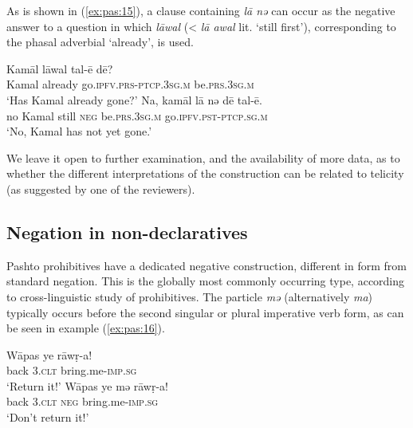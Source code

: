 \documentclass[output=paper,colorlinks,citecolor=brown]{langscibook}
\begin{document}
As is shown in (\ref{ex:pas:15}), a clause containing \textit{l\={a}  nə} can occur as the negative answer to a question in which \textit{l\={a}wal} (< \textit{l\={a} awal} lit. ‘still first’), corresponding to the phasal adverbial ‘already’, is used.

\ea\label{ex:pas:15}
    \ea\label{ex:pas:15a}
        \gll Kam\={a}l l\={a}wal tal-\={e} d\={e}? \\
             Kamal already go.\textsc{ipfv.prs-ptcp.3sg.m} be.\textsc{prs.3sg.m} \\
        \glt ‘Has Kamal already gone?’
    \ex\label{ex:pas:15b}
        \gll Na, kam\={a}l l\={a} nə d\={e} tal-\={e}.\\
             no Kamal still \textsc{neg} be.\textsc{prs.3sg.m}  go.\textsc{ipfv.pst-ptcp.sg.m}\\
        \glt ‘No, Kamal has not yet gone.’
    \z
\z 

We leave it open to further examination, and the availability of more data, as to whether the different interpretations of the construction can be related to telicity (as suggested by one of the reviewers).

\subsection{Negation in non-declaratives}\label{sec:pas:2.2}

Pashto prohibitives have a dedicated negative construction, different in form from standard negation. This is the globally most commonly occurring type, according to  cross-linguistic study of prohibitives. The particle \textit{mə} (alternatively \textit{ma}) typically occurs before the second singular or plural imperative verb form, as can be seen in example (\ref{ex:pas:16}). 

\ea\label{ex:pas:16}
    \ea\label{ex:pas:16a}
        \gll W\={a}pas ye rāwṛ{}-a!\\
             back \textsc{3.clt} bring.me{}-\textsc{imp.sg}\\
        \glt ‘Return it!’
    \ex\label{ex:pas:16b}
        \gll Wāpas ye mə rāwṛ{}-a!\\
             back \textsc{3.clt} \textsc{neg} bring.me{}-\textsc{imp.sg}\\
        \glt ‘Don’t return it!’
    \z
\z 
\end{document}
